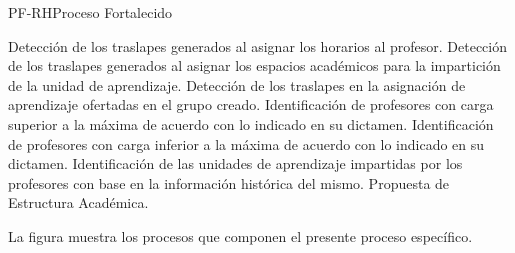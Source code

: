 \begin{Proceso}{PF-RH}{Proceso Fortalecido}
{\begin{Titemize}
\Titem Detección de los traslapes generados al asignar los horarios al profesor.
			\Titem Detección de los traslapes generados al asignar los espacios académicos para la impartición de la unidad de aprendizaje.
			\Titem Detección de los traslapes en la asignación de aprendizaje ofertadas en el grupo creado.
			\Titem Identificación de profesores con carga superior a la máxima de acuerdo con lo indicado en su dictamen.
			\Titem Identificación de profesores con carga inferior a la máxima de acuerdo con lo indicado en su dictamen.
			\Titem Identificación de las unidades de aprendizaje impartidas por los profesores con base en la información histórica del mismo.
 			\Titem Propuesta de Estructura Académica.
		\end{Titemize}		
	}
\end{Proceso}



	La figura  muestra los procesos que componen el presente proceso específico.


